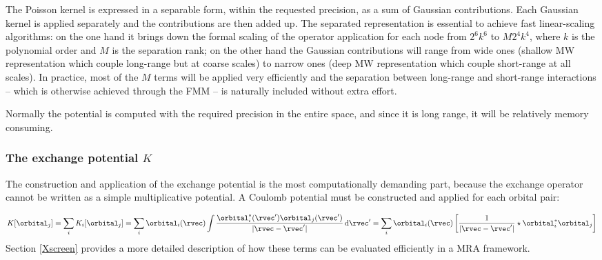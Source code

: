 The Poisson kernel is expressed in a separable form, within the requested precision, as a sum of Gaussian contributions.\cite{Beylkin.10.1016/j.acha.2005.01.003} Each Gaussian kernel is applied separately and the contributions are then added up. The separated representation is essential to achieve fast linear-scaling algorithms: on the one hand it brings down the formal scaling of the operator application for each node from $2^6 k^6$ to $M 2^4 k^4$, where $k$ is the polynomial order and $M$ is the separation rank; on the other hand the Gaussian contributions will range from wide ones (shallow \ac{MW} representation which couple long-range but at coarse scales) to narrow ones (deep \ac{MW} representation which couple short-range at all scales). In practice, most of the $M$ terms will be applied very efficiently and the separation between long-range and short-range interactions -- which is otherwise achieved through the \ac{FMM} -- is naturally included without extra effort.\cite{Frediani.10.1080/00268976.2013.810793, Beylkin.10.1016/j.acha.2007.01.001}

Normally the potential is computed with the required precision in the entire space, and since it is long range, it will be relatively memory consuming.

\subsubsection{The exchange potential $K$}\label{sec:compute-K}
The construction and application of the exchange potential is the most computationally demanding part, because the exchange operator cannot be written as a simple multiplicative potential. A Coulomb potential must be constructed and applied for each orbital pair:

\begin{equation}
  K[\orbital_j] = \sum_i K_i[\orbital_j] = 
  \sum_i \orbital_i(\rvec) \int \frac{\orbital^*_i(\rvec')\orbital_j(\rvec')}{|\rvec-\rvec'|} \, \mathrm{d}\rvec'
  =
  \sum_i \orbital_i(\rvec) \left[
  \frac{1}{|\rvec-\rvec'|} \star 
  \orbital^*_i\orbital_j
  \right]
\end{equation}
Section \ref{Xscreen} provides a more detailed description of how these terms can be evaluated efficiently in a \ac{MRA} framework. 

